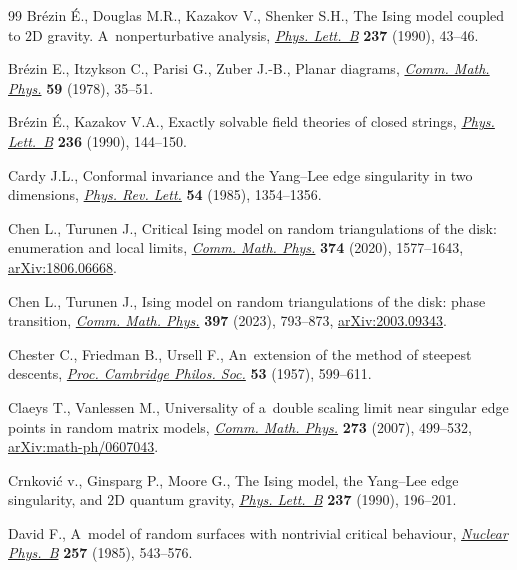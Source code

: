 \documentclass[10pt,a4paper]{amsart}
\numberwithin{equation}{section}
\begin{document}
\begin{thebibliography}{99}
Br\'ezin {\'E}., Douglas M.R., Kazakov V., Shenker S.H., The {I}sing model
 coupled to {$2$}{D} gravity. {A}~nonperturbative analysis,
 \href{https://doi.org/10.1016/0370-2693(90)90458-I}{\textit{Phys. Lett.~B}}
 \textbf{237} (1990), 43--46.

Br\'ezin E., Itzykson C., Parisi G., Zuber J.-B., Planar diagrams,
 \href{https://doi.org/10.1007/BF01614153}{\textit{Comm. Math. Phys.}}
 \textbf{59} (1978), 35--51.

Br\'ezin {\'E}., Kazakov V.A., Exactly solvable field theories of closed
 strings, \href{https://doi.org/10.1016/0370-2693(90)90818-Q}{\textit{Phys.
 Lett.~B}} \textbf{236} (1990), 144--150.

Cardy J.L., Conformal invariance and the {Y}ang--{L}ee edge singularity in two
 dimensions, \href{https://doi.org/10.1103/PhysRevLett.54.1354}{\textit{Phys.
 Rev. Lett.}} \textbf{54} (1985), 1354--1356.

Chen L., Turunen J., Critical {I}sing model on random triangulations of the
 disk: enumeration and local limits,
 \href{https://doi.org/10.1007/s00220-019-03672-5}{\textit{Comm. Math. Phys.}}
 \textbf{374} (2020), 1577--1643,
 \href{http://arxiv.org/abs/1806.06668}{arXiv:1806.06668}.

Chen L., Turunen J., Ising model on random triangulations of the disk: phase
 transition, \href{https://doi.org/10.1007/s00220-022-04508-5}{\textit{Comm.
 Math. Phys.}} \textbf{397} (2023), 793--873,
 \href{http://arxiv.org/abs/2003.09343}{arXiv:2003.09343}.

Chester C., Friedman B., Ursell F., An~extension of the method of steepest
 descents, \href{https://doi.org/10.1017/s0305004100032655}{\textit{Proc.
 Cambridge Philos. Soc.}} \textbf{53} (1957), 599--611.

Claeys T., Vanlessen M., Universality of a~double scaling limit near singular
 edge points in random matrix models,
 \href{https://doi.org/10.1007/s00220-007-0256-9}{\textit{Comm. Math. Phys.}}
 \textbf{273} (2007), 499--532,
 \href{http://arxiv.org/abs/math-ph/0607043}{arXiv:math-ph/0607043}.

Crnkovi\'c v., Ginsparg P., Moore G., The {I}sing model, the {Y}ang--{L}ee edge
 singularity, and {$2$}{D} quantum gravity,
 \href{https://doi.org/10.1016/0370-2693(90)91428-E}{\textit{Phys. Lett.~B}}
 \textbf{237} (1990), 196--201.

David F., A~model of random surfaces with nontrivial critical behaviour,
 \href{https://doi.org/10.1016/0550-3213(85)90363-3}{\textit{Nuclear Phys.~B}}
 \textbf{257} (1985), 543--576.


\end{thebibliography}
\end{document}
